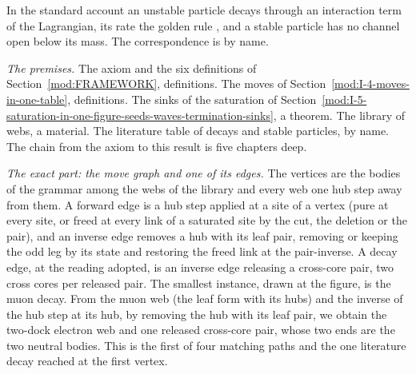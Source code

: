 \begin{chbridge}
In the standard account an unstable particle decays through an interaction term of the Lagrangian, its rate the golden rule \cite{Dirac1927,Fermi1934}, and a stable particle has no channel open below its mass. The correspondence is by name.
\end{chbridge}
\begin{chproof}
\textit{The premises.} The axiom and the six definitions of Section~\ref{mod:FRAMEWORK}, definitions. The moves of Section~\ref{mod:I-4-moves-in-one-table}, definitions. The sinks of the saturation of Section~\ref{mod:I-5-saturation-in-one-figure-seeds-waves-termination-sinks}, a theorem. The library of webs, a material. The literature table of decays and stable particles, by name. The chain from the axiom to this result is five chapters deep.

\textit{The exact part: the move graph and one of its edges.} The vertices are the bodies of the grammar among the webs of the library and every web one hub step away from them. A forward edge is a hub step applied at a site of a vertex (pure at every site, or freed at every link of a saturated site by the cut, the deletion or the pair), and an inverse edge removes a hub with its leaf pair, removing or keeping the odd leg by its state and restoring the freed link at the pair-inverse. A decay edge, at the reading adopted, is an inverse edge releasing a cross-core pair, two cross cores per released pair. The smallest instance, drawn at the figure, is the muon decay. From the muon web (the leaf form with its hubs) and the inverse of the hub step at its hub, by removing the hub with its leaf pair, we obtain the two-dock electron web and one released cross-core pair, whose two ends are the two neutral bodies. This is the first of four matching paths and the one literature decay reached at the first vertex.


\end{chproof}
